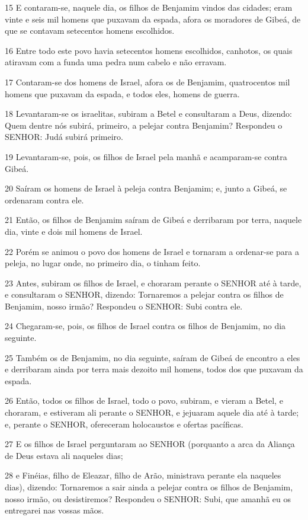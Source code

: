 \par 15 E contaram-se, naquele dia, os filhos de Benjamim vindos das cidades; eram vinte e seis mil homens que puxavam da espada, afora os moradores de Gibeá, de que se contavam setecentos homens escolhidos.
\par 16 Entre todo este povo havia setecentos homens escolhidos, canhotos, os quais atiravam com a funda uma pedra num cabelo e não erravam.
\par 17 Contaram-se dos homens de Israel, afora os de Benjamim, quatrocentos mil homens que puxavam da espada, e todos eles, homens de guerra.
\par 18 Levantaram-se os israelitas, subiram a Betel e consultaram a Deus, dizendo: Quem dentre nós subirá, primeiro, a pelejar contra Benjamim? Respondeu o SENHOR: Judá subirá primeiro.
\par 19 Levantaram-se, pois, os filhos de Israel pela manhã e acamparam-se contra Gibeá.
\par 20 Saíram os homens de Israel à peleja contra Benjamim; e, junto a Gibeá, se ordenaram contra ele.
\par 21 Então, os filhos de Benjamim saíram de Gibeá e derribaram por terra, naquele dia, vinte e dois mil homens de Israel.
\par 22 Porém se animou o povo dos homens de Israel e tornaram a ordenar-se para a peleja, no lugar onde, no primeiro dia, o tinham feito.
\par 23 Antes, subiram os filhos de Israel, e choraram perante o SENHOR até à tarde, e consultaram o SENHOR, dizendo: Tornaremos a pelejar contra os filhos de Benjamim, nosso irmão? Respondeu o SENHOR: Subi contra ele.
\par 24 Chegaram-se, pois, os filhos de Israel contra os filhos de Benjamim, no dia seguinte.
\par 25 Também os de Benjamim, no dia seguinte, saíram de Gibeá de encontro a eles e derribaram ainda por terra mais dezoito mil homens, todos dos que puxavam da espada.
\par 26 Então, todos os filhos de Israel, todo o povo, subiram, e vieram a Betel, e choraram, e estiveram ali perante o SENHOR, e jejuaram aquele dia até à tarde; e, perante o SENHOR, ofereceram holocaustos e ofertas pacíficas.
\par 27 E os filhos de Israel perguntaram ao SENHOR (porquanto a arca da Aliança de Deus estava ali naqueles dias;
\par 28 e Finéias, filho de Eleazar, filho de Arão, ministrava perante ela naqueles dias), dizendo: Tornaremos a sair ainda a pelejar contra os filhos de Benjamim, nosso irmão, ou desistiremos? Respondeu o SENHOR: Subi, que amanhã eu os entregarei nas vossas mãos.
